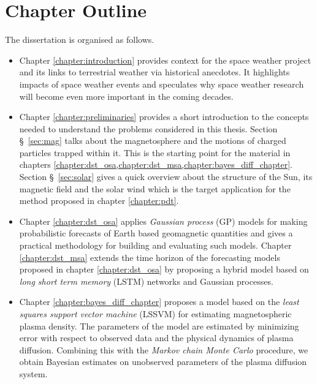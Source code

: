 \section{Chapter Outline}

The dissertation is organised as follows.

\begin{itemize}
    \item Chapter \ref{chapter:introduction} provides context for the space weather project and its 
    links to terrestrial weather via historical anecdotes. It highlights impacts of space weather events 
    and speculates why space weather research will become even more important in the coming decades.

    \item Chapter \ref{chapter:preliminaries} provides a short introduction to the concepts needed to 
    understand the problems considered in this thesis. Section \S~\ref{sec:mag} talks about the magnetosphere and 
    the motions of charged particles trapped within it. This is the starting point for the material in chapters 
    \cref{chapter:dst_osa,chapter:dst_msa,chapter:bayes_diff_chapter}. Section \S~\ref{sec:solar} gives a 
    quick overview about the structure of the Sun, its magnetic field and the solar wind which is the target 
    application for the method proposed in chapter \ref{chapter:pdt}.
    
    \item Chapter \ref{chapter:dst_osa} applies \emph{Gaussian process} (GP) models for making probabilistic 
    forecasts of Earth based geomagnetic quantities and gives a practical methodology for building and evaluating 
    such models. Chapter \ref{chapter:dst_msa} extends the time horizon of the forecasting models proposed in 
    chapter \ref{chapter:dst_osa} by proposing a hybrid model based on \emph{long short term memory} (LSTM) networks 
    and Gaussian processes.
    
    \item Chapter \ref{chapter:bayes_diff_chapter} proposes a model based on the 
    \emph{least squares support vector machine} (LSSVM) for estimating magnetospheric plasma density. The parameters 
    of the model are estimated by minimizing error with respect to observed data and the physical dynamics of 
    plasma diffusion. Combining this with the \emph{Markov chain Monte Carlo} procedure, we obtain Bayesian 
    estimates on unobserved parameters of the plasma diffusion system.   
    

\end{itemize}
